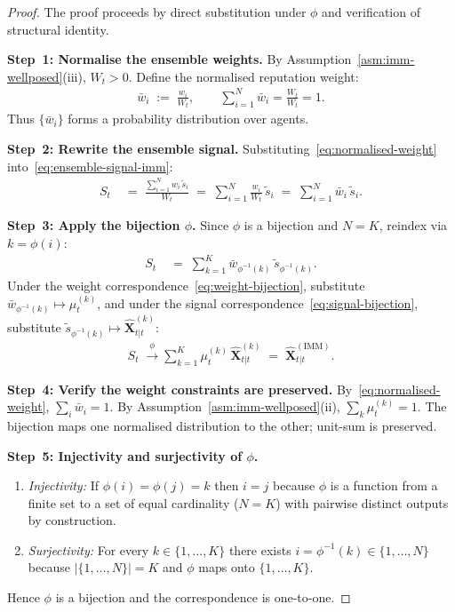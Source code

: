 \documentclass[12pt,openany]{book}
\numberwithin{equation}{chapter}
\theoremstyle{plain}
\theoremstyle{definition}
\theoremstyle{remark}
\begin{document}
\begin{proof}
The proof proceeds by direct substitution under $\phi$ and
verification of structural identity.

\medskip
\noindent\textbf{Step~1: Normalise the ensemble weights.}
By Assumption~\ref{asm:imm-wellposed}(iii), $W_t > 0$.
Define the normalised reputation weight:
\begin{align}
  \bar{w}_i \;:=\; \frac{w_i}{W_t},
  \qquad
  \sum_{i=1}^{N} \bar{w}_i = \frac{W_t}{W_t} = 1.
  \label{eq:normalised-weight}
\end{align}
Thus $\{\bar{w}_i\}$ forms a probability distribution over
agents.

\medskip
\noindent\textbf{Step~2: Rewrite the ensemble signal.}
Substituting~\eqref{eq:normalised-weight}
into~\eqref{eq:ensemble-signal-imm}:
\begin{align}
  S_t
  &\;=\;
  \frac{\sum_{i=1}^{N} w_i\,\tilde{s}_i}{W_t}
  \;=\;
  \sum_{i=1}^{N} \frac{w_i}{W_t}\,\tilde{s}_i
  \;=\;
  \sum_{i=1}^{N} \bar{w}_i\,\tilde{s}_i.
  \label{eq:ensemble-rewrite}
\end{align}

\medskip
\noindent\textbf{Step~3: Apply the bijection $\phi$.}
Since $\phi$ is a bijection and $N = K$, reindex
via $k = \phi(i)$:
\begin{align}
  S_t
  &\;=\;
  \sum_{k=1}^{K}
  \bar{w}_{\phi^{-1}(k)}\,
  \tilde{s}_{\phi^{-1}(k)}.
  \label{eq:ensemble-reindexed}
\end{align}
Under the weight correspondence~\eqref{eq:weight-bijection},
substitute $\bar{w}_{\phi^{-1}(k)} \mapsto \mu_t^{(k)}$, and
under the signal correspondence~\eqref{eq:signal-bijection},
substitute $\tilde{s}_{\phi^{-1}(k)} \mapsto
\hat{\mathbf{X}}_{t|t}^{(k)}$:
\begin{align}
  S_t
  \;\xrightarrow{\;\phi\;}
  \sum_{k=1}^{K}
  \mu_t^{(k)}\,\hat{\mathbf{X}}_{t|t}^{(k)}
  \;=\;
  \hat{\mathbf{X}}_{t|t}^{(\mathrm{IMM})}.
  \label{eq:bijection-applied}
\end{align}

\medskip
\noindent\textbf{Step~4: Verify the weight constraints are
preserved.}
By~\eqref{eq:normalised-weight}, $\sum_i \bar{w}_i = 1$.
By Assumption~\ref{asm:imm-wellposed}(ii),
$\sum_k \mu_t^{(k)} = 1$.  The bijection maps one
normalised distribution to the other; unit-sum is preserved.

\medskip
\noindent\textbf{Step~5: Injectivity and surjectivity of
$\phi$.}
\begin{enumerate}
  \item \emph{Injectivity:} If $\phi(i) = \phi(j) = k$ then
        $i = j$ because $\phi$ is a function from a finite set
        to a set of equal cardinality ($N = K$) with pairwise
        distinct outputs by construction.
  \item \emph{Surjectivity:} For every $k \in \{1,\ldots,K\}$
        there exists $i = \phi^{-1}(k) \in \{1,\ldots,N\}$
        because $|\{1,\ldots,N\}| = K$ and $\phi$ maps onto
        $\{1,\ldots,K\}$.
\end{enumerate}
Hence $\phi$ is a bijection and the correspondence is
one-to-one.


\end{proof}
\end{document}
